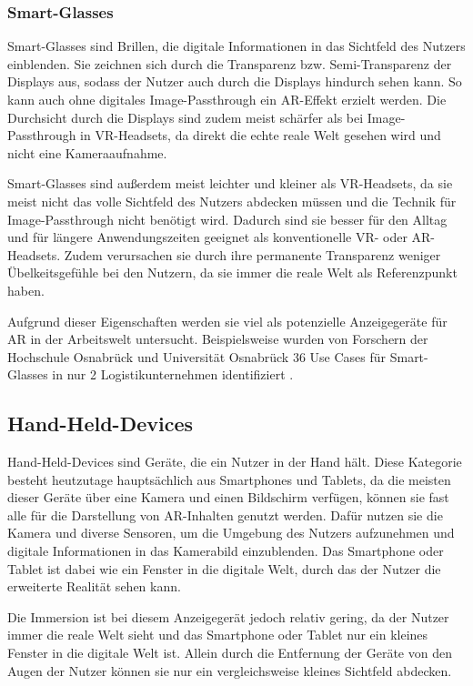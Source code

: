     \subsubsection{Smart-Glasses}

    Smart-Glasses sind Brillen, die digitale Informationen in das Sichtfeld des Nutzers einblenden.
    Sie zeichnen sich durch die Transparenz bzw. Semi-Transparenz der Displays aus, sodass der Nutzer auch durch die Displays hindurch sehen kann.
    So kann auch ohne digitales Image-Passthrough ein AR-Effekt erzielt werden.
    Die Durchsicht durch die Displays sind zudem meist schärfer als bei Image-Passthrough in VR-Headsets, da direkt die echte reale Welt gesehen wird und nicht eine Kameraaufnahme.

    Smart-Glasses sind außerdem meist leichter und kleiner als VR-Headsets, da sie meist nicht das volle Sichtfeld des Nutzers abdecken müssen und die Technik für Image-Passthrough nicht benötigt wird.
    Dadurch sind sie besser für den Alltag und für längere Anwendungszeiten geeignet als konventionelle VR- oder AR-Headsets.
    Zudem verursachen sie durch ihre permanente Transparenz weniger Übelkeitsgefühle bei den Nutzern, da sie immer die reale Welt als Referenzpunkt haben.

    Aufgrund dieser Eigenschaften werden sie viel als potenzielle Anzeigegeräte für AR in der Arbeitswelt untersucht.
    Beispielsweise wurden von Forschern der Hochschule Osnabrück und Universität Osnabrück 36 Use Cases für Smart-Glasses in nur 2 Logistikunternehmen identifiziert \autocite[]{SmartGlasses2017}.


  \subsection{Hand-Held-Devices}

  Hand-Held-Devices sind Geräte, die ein Nutzer in der Hand hält.
  Diese Kategorie besteht heutzutage hauptsächlich aus Smartphones und Tablets, da die meisten dieser Geräte über eine Kamera und einen Bildschirm verfügen, können sie fast alle für die Darstellung von AR-Inhalten genutzt werden.
  Dafür nutzen sie die Kamera und diverse Sensoren, um die Umgebung des Nutzers aufzunehmen und digitale Informationen in das Kamerabild einzublenden.
  Das Smartphone oder Tablet ist dabei wie ein Fenster in die digitale Welt, durch das der Nutzer die erweiterte Realität sehen kann.

  Die Immersion ist bei diesem Anzeigegerät jedoch relativ gering, da der Nutzer immer die reale Welt sieht und das Smartphone oder Tablet nur ein kleines Fenster in die digitale Welt ist.
  Allein durch die Entfernung der Geräte von den Augen der Nutzer können sie nur ein vergleichsweise kleines Sichtfeld abdecken.

